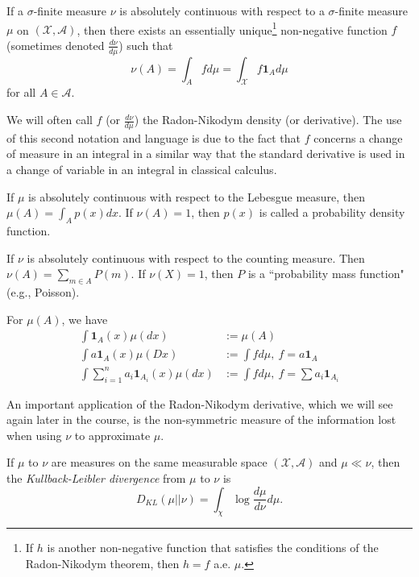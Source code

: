 \documentclass[twoside]{article}
\begin{document}
\begin{theorem}\citep[Def. 1.10, p.~7]{keener}
  If a $\sigma$-finite measure $\nu$ is absolutely continuous with respect to a
  $\sigma$-finite measure $\mu$ on $(\mathcal X, \mathcal A)$, then there exists
  an essentially unique\footnote{If $h$ is
  another non-negative function that satisfies the conditions of the Radon-Nikodym theorem,
  then $h=f$ a.e. $\mu$.} non-negative function $f$
  (sometimes denoted $\frac{d\nu}{d\mu}$) such that
  \[\nu(A) = \int_A f d\mu = \int_{\mathcal X} f \mathbf{1}_A d\mu\]
  for all $A \in \mathcal A$.
\end{theorem}

We will often call $f$ (or $\frac{d\nu}{d\mu}$) the Radon-Nikodym density (or
derivative).  The use of this second notation and language is due to the fact that
$f$ concerns a change of measure in an integral in a similar way that the
standard derivative is used in a change of variable in an integral in classical
calculus. 

\begin{example}
  If $\mu$ is absolutely continuous with respect to the Lebesgue measure,
  then $\mu(A) = \int_A p(x) dx$.  If $\nu(A) =
  1$, then $p(x)$ is called a probability density function.
\end{example}

\begin{example}
  If $\nu$ is absolutely continuous with respect to the counting measure. Then $\nu(A)
  = \sum_{m \in A} P(m)$.  If $\nu(X) = 1$, then $P$ is a ``probability mass
  function" (e.g., Poisson).
\end{example}

For $\mu(A)$, we have
\begin{align*}
   \int \mathbf{1}_A(x) \mu(dx) &:= \mu(A) \\
   \int a \mathbf{1}_A(x) \mu(Dx) &:= \int f d\mu,\ f = a \mathbf{1}_A \\
   \int \sum_{i=1}^n a_i \mathbf{1}_{A_i}(x) \mu(dx) &:= \int f d\mu,\ f = \sum
   a_i \mathbf{1}_{A_i}
\end{align*}

An important application of the Radon-Nikodym derivative, which we will see
again later in the course, is the non-symmetric measure of the information
lost when using $\nu$ to approximate $\mu$.

\begin{definition}
  If  $\mu$ to $\nu$ are measures on the same measurable space
  $(\mathcal X, \mathcal A)$ and
  $\mu \ll \nu$, then the \emph{Kullback-Leibler divergence} from
  $\mu$ to $\nu$ is
  \[ D_{KL}(\mu || \nu) = \int_\chi \log \frac{d\mu}{d\nu} d\mu. \]
\end{definition}
\end{document}
